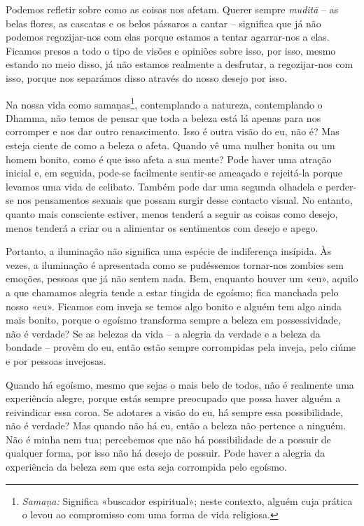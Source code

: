 Podemos refletir sobre como as coisas nos afetam. Querer sempre \emph{muditā} --
as belas flores, as cascatas e os belos pássaros a cantar -- significa que já
não podemos regozijar-nos com elas porque estamos a tentar agarrar-nos a elas.
Ficamos presos a todo o tipo de visões e opiniões sobre isso, por isso, mesmo
estando no meio disso, já não estamos realmente a desfrutar, a regozijar-nos
com isso, porque nos separámos disso através do nosso desejo por isso.

Na nossa vida como samaṇas\footnote{\emph{Samaṇa:} Significa «buscador
  espiritual»; neste contexto, alguém cuja prática o levou ao compromisso com
  uma forma de vida religiosa.}, contemplando a natureza, contemplando o Dhamma,
não temos de pensar que toda a beleza está lá apenas para nos corromper e nos
dar outro renascimento. Isso é outra visão do eu, não é? Mas esteja ciente de
como a beleza o afeta. Quando vê uma mulher bonita ou um homem bonito, como é
que isso afeta a sua mente? Pode haver uma atração inicial e, em seguida,
pode-se facilmente sentir-se ameaçado e rejeitá-la porque levamos uma vida de
celibato. Também pode dar uma segunda olhadela e perder-se nos pensamentos
sexuais que possam surgir desse contacto visual. No entanto, quanto mais
consciente estiver, menos tenderá a seguir as coisas como desejo, menos tenderá
a criar ou a alimentar os sentimentos com desejo e apego.

Portanto, a iluminação não significa uma espécie de indiferença insípida. Às
vezes, a iluminação é apresentada como se pudéssemos tornar-nos zombies sem
emoções, pessoas que já não sentem nada. Bem, enquanto houver um «eu», aquilo a
que chamamos alegria tende a estar tingida de egoísmo; fica manchada pelo nosso
«eu». Ficamos com inveja se temos algo bonito e alguém tem algo ainda mais
bonito, porque o egoísmo transforma sempre a beleza em possessividade, não é
verdade? Se as belezas da vida -- a alegria da verdade e a beleza da bondade --
provêm do eu, então estão sempre corrompidas pela inveja, pelo ciúme e por
pessoas invejosas.

Quando há egoísmo, mesmo que sejas o mais belo de todos, não é realmente uma
experiência alegre, porque estás sempre preocupado que possa haver alguém a
reivindicar essa coroa. Se adotares a visão do eu, há sempre essa possibilidade,
não é verdade? Mas quando não há eu, então a beleza não pertence a ninguém. Não
é minha nem tua; percebemos que não há possibilidade de a possuir de qualquer
forma, por isso não há desejo de possuir. Pode haver a alegria da experiência da
beleza sem que esta seja corrompida pelo egoísmo.

